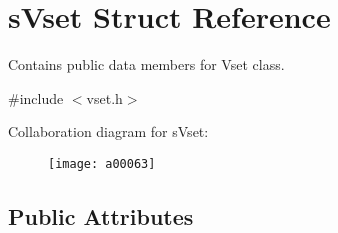 \section{s\+Vset Struct Reference}
\label{a00006}


Contains public data members for Vset class.  




{\ttfamily \#include $<$vset.\+h$>$}



Collaboration diagram for s\+Vset\+:\nopagebreak
\begin{figure}[H]
\begin{center}
\leavevmode
\texttt{[image: a00063]}
\end{center}
\end{figure}
\subsection*{Public Attributes}
